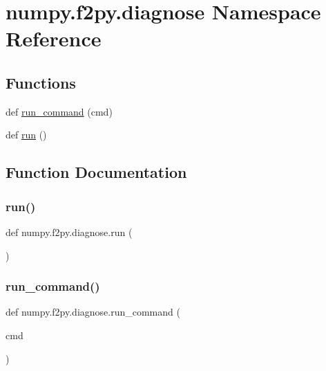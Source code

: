 \hypertarget{namespacenumpy_1_1f2py_1_1diagnose}{}\section{numpy.\+f2py.\+diagnose Namespace Reference}
\label{namespacenumpy_1_1f2py_1_1diagnose}
\subsection*{Functions}
\begin{DoxyCompactItemize}
\item 
def \hyperlink{namespacenumpy_1_1f2py_1_1diagnose_a9936b159f976e7d617463e24899849eb}{run\+\_\+command} (cmd)
\item 
def \hyperlink{namespacenumpy_1_1f2py_1_1diagnose_a1ddad54af6399fc0c9a318ab7d75f283}{run} ()
\end{DoxyCompactItemize}


\subsection{Function Documentation}
\mbox{\label{namespacenumpy_1_1f2py_1_1diagnose_a1ddad54af6399fc0c9a318ab7d75f283}} 
\subsubsection{\texorpdfstring{run()}{run()}}
{\footnotesize\ttfamily def numpy.\+f2py.\+diagnose.\+run (\begin{DoxyParamCaption}{ }\end{DoxyParamCaption})}

\mbox{\label{namespacenumpy_1_1f2py_1_1diagnose_a9936b159f976e7d617463e24899849eb}} 
\subsubsection{\texorpdfstring{run\+\_\+command()}{run\_command()}}
{\footnotesize\ttfamily def numpy.\+f2py.\+diagnose.\+run\+\_\+command (\begin{DoxyParamCaption}\item[{}]{cmd }\end{DoxyParamCaption})}

